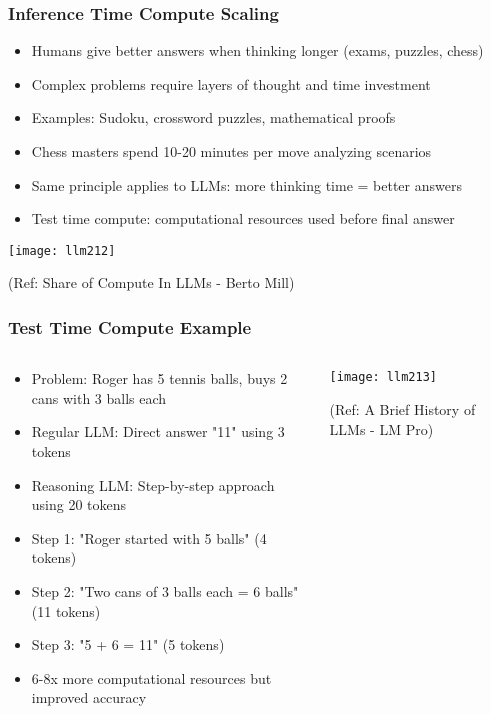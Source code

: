 \begin{frame}[fragile]\frametitle{Inference Time Compute Scaling}

      \begin{itemize}
        \item Humans give better answers when thinking longer (exams, puzzles, chess)
        \item Complex problems require layers of thought and time investment
        \item Examples: Sudoku, crossword puzzles, mathematical proofs
        \item Chess masters spend 10-20 minutes per move analyzing scenarios
        \item Same principle applies to LLMs: more thinking time = better answers
        \item Test time compute: computational resources used before final answer
      \end{itemize}

        \begin{center}
        \texttt{[image: llm212]}
		
		{\tiny (Ref: Share of Compute In LLMs - Berto Mill)}
        \end{center}	

\end{frame}

\begin{frame}[fragile]\frametitle{Test Time Compute Example}
\begin{columns}
    \begin{column}[T]{0.5\linewidth}
      \begin{itemize}
        \item Problem: Roger has 5 tennis balls, buys 2 cans with 3 balls each
        \item Regular LLM: Direct answer "11" using 3 tokens
        \item Reasoning LLM: Step-by-step approach using 20 tokens
        \item Step 1: "Roger started with 5 balls" (4 tokens)
        \item Step 2: "Two cans of 3 balls each = 6 balls" (11 tokens)
        \item Step 3: "5 + 6 = 11" (5 tokens)
        \item 6-8x more computational resources but improved accuracy
      \end{itemize}
    \end{column}
    \begin{column}[T]{0.5\linewidth}
        \begin{center}
        \texttt{[image: llm213]}
		
		{\tiny (Ref: A Brief History of LLMs - LM Pro)}
        \end{center}	
    \end{column}
  \end{columns}
\end{frame}

